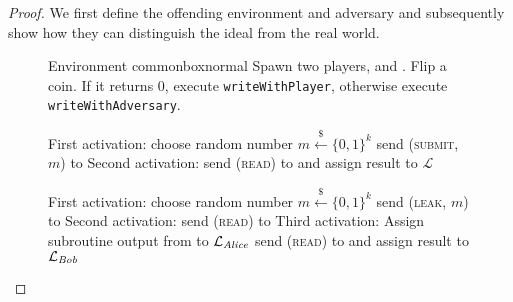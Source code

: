   \begin{proof}
    We first define the offending environment and adversary and subsequently
    show how they can distinguish the ideal from the real world.
    \begin{figure}[H]
      \begin{titlebox}{Environment \normalfont \perfectenv}{commonbox}{normal}
        Spawn two players, \alice{} and \bob. Flip a coin. If it returns 0,
        execute \texttt{writeWithPlayer}, otherwise execute
        \texttt{writeWithAdversary}.
        \begin{algorithmic}[1]
            \State First activation:
            \Indent
              \State choose random number $m \overset{\$}{\gets} \{0, 1\}^k$
              \State send (\textsc{submit}, $m$) to \alice
            \EndIndent
            \State Second activation:
            \Indent
              \State send (\textsc{read}) to \bob{} and assign result to
              $\mathcal{L}$
                \State {} 
                \label{fig:perfectledger:env:coin0:in}
              \Else
                \State {} 
                \label{fig:perfectledger:env:coin0:out}
              \EndIf
            \EndIndent
          \EndProcedure
          \Statex

            \State First activation:
            \Indent
              \State choose random number $m \overset{\$}{\gets} \{0, 1\}^k$
              \State send (\textsc{leak}, $m$) to \adversary{} 
            \EndIndent
            \State Second activation:
            \Indent
              \State send (\textsc{read}) to \alice
            \EndIndent
            \State Third activation:
            \Indent
              \State Assign subroutine output from \alice{} to
              $\mathcal{L}_{\mathit{Alice}}$
              \State send (\textsc{read}) to \bob{} and assign result to
              $\mathcal{L}_{\mathit{Bob}}$
                \State {} 
                \label{fig:perfectledger:env:coin1:ideal}
              \Else
                \State {} 
                \label{fig:perfectledger:env:coin1:real}
              \EndIf
            \EndIndent
          \EndProcedure
        \end{algorithmic}
      \end{titlebox}
      \caption{}
      \label{fig:perfectledger:env}
    \end{figure}


\end{proof}
